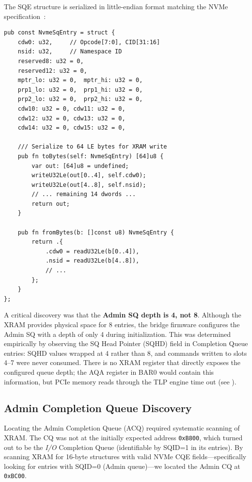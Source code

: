 \documentclass[conference]{IEEEtran}
\begin{document}
The SQE structure is serialized in little-endian format matching the
NVMe specification~\cite{nvme-spec-2.0}:

\begin{lstlisting}[language=Zig,caption={NVMe Submission Queue Entry
structure with serialization.},label={lst:sqe}]
pub const NvmeSqEntry = struct {
    cdw0: u32,     // Opcode[7:0], CID[31:16]
    nsid: u32,     // Namespace ID
    reserved8: u32 = 0,
    reserved12: u32 = 0,
    mptr_lo: u32 = 0,  mptr_hi: u32 = 0,
    prp1_lo: u32 = 0,  prp1_hi: u32 = 0,
    prp2_lo: u32 = 0,  prp2_hi: u32 = 0,
    cdw10: u32 = 0, cdw11: u32 = 0,
    cdw12: u32 = 0, cdw13: u32 = 0,
    cdw14: u32 = 0, cdw15: u32 = 0,

    /// Serialize to 64 LE bytes for XRAM write
    pub fn toBytes(self: NvmeSqEntry) [64]u8 {
        var out: [64]u8 = undefined;
        writeU32Le(out[0..4], self.cdw0);
        writeU32Le(out[4..8], self.nsid);
        // ... remaining 14 dwords ...
        return out;
    }

    pub fn fromBytes(b: []const u8) NvmeSqEntry {
        return .{
            .cdw0 = readU32Le(b[0..4]),
            .nsid = readU32Le(b[4..8]),
            // ...
        };
    }
};
\end{lstlisting}

A critical discovery was that the \textbf{Admin SQ depth is 4, not 8}.
Although the XRAM provides physical space for 8 entries, the bridge
firmware configures the Admin SQ with a depth of only 4 during
initialization. This was determined empirically by observing the SQ Head
Pointer (SQHD) field in Completion Queue entries: SQHD values wrapped at
4 rather than 8, and commands written to slots 4--7 were never consumed.
There is no XRAM register that directly exposes the configured queue
depth; the AQA register in BAR0 would contain this information, but
PCIe memory reads through the TLP engine time out (see
).


\subsection{Admin Completion Queue Discovery}
\label{sec:cq-discovery}

Locating the Admin Completion Queue (ACQ) required systematic scanning
of XRAM. The CQ was not at the initially expected address
\texttt{0xB800}, which turned out to be the \emph{I/O} Completion Queue
(identifiable by SQID=1 in its entries). By scanning XRAM for 16-byte
structures with valid NVMe CQE fields---specifically looking for entries
with SQID=0 (Admin queue)---we located the Admin CQ at
\texttt{0xBC00}.
\end{document}
